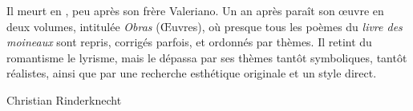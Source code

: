 Il meurt en , peu après son frère Valeriano. Un an
après paraît son œuvre en deux volumes, intitulée \emph{Obras}
(Œuvres), où presque tous les poèmes du \emph{livre des moineaux} sont
repris, corrigés parfois, et ordonnés par thèmes. Il retint du
romantisme le lyrisme, mais le dépassa par ses thèmes tantôt
symboliques, tantôt réalistes, ainsi que par une recherche esthétique
originale et un style direct.

\bigskip
\bigskip
\bigskip
\bigskip
\hfill Christian Rinderknecht

